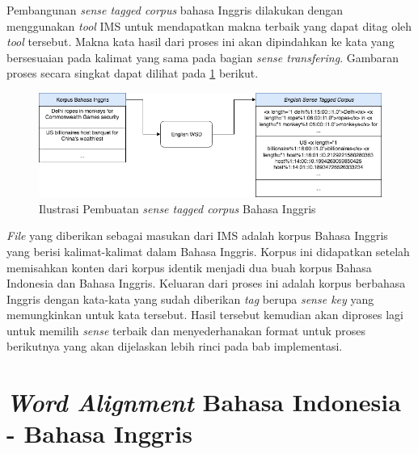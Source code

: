 Pembangunan \textit{sense tagged corpus} bahasa Inggris dilakukan dengan menggunakan \textit{tool} IMS \citep{zhong2010makes} untuk mendapatkan makna terbaik yang dapat ditag oleh \textit{tool} tersebut. Makna kata hasil dari proses ini akan dipindahkan ke kata yang bersesuaian pada kalimat yang sama pada bagian \textit{sense transfering}. Gambaran proses secara singkat dapat dilihat pada \ref{fig:producing-en-tag-corpus} berikut.


\begin{figure}
	\centering
	\includegraphics[width=1\linewidth]{adit_pics/bab-3-en-tag-corpus.png}
	\caption{Ilustrasi Pembuatan \textit{sense tagged corpus} Bahasa Inggris}
	\label{fig:producing-en-tag-corpus}
\end{figure}

\textit{File} yang diberikan sebagai masukan dari IMS adalah korpus Bahasa Inggris yang berisi kalimat-kalimat  dalam Bahasa Inggris. Korpus ini didapatkan setelah memisahkan konten dari korpus identik menjadi dua buah korpus Bahasa Indonesia dan Bahasa Inggris. Keluaran dari proses ini adalah korpus berbahasa Inggris dengan kata-kata yang sudah diberikan \textit{tag} berupa \textit{sense key} yang memungkinkan untuk kata tersebut. Hasil tersebut kemudian akan diproses lagi untuk memilih \textit{sense} terbaik dan menyederhanakan format untuk proses berikutnya yang akan dijelaskan lebih rinci pada bab implementasi.
\section{\textit{Word Alignment} Bahasa Indonesia - Bahasa Inggris}

